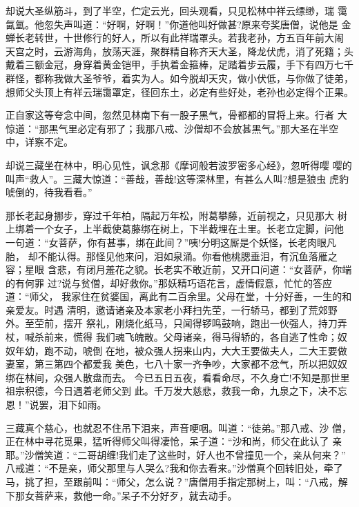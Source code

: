 却说大圣纵筋斗，到了半空，伫定云光，回头观看，只见松林中祥云缥缈，瑞
霭氤氲。他忽失声叫道：“好啊，好啊！”你道他叫好做甚?原来夸奖唐僧，说他是
金蝉长老转世，十世修行的好人，所以有此祥瑞罩头。若我老孙，方五百年前大闹
天宫之时，云游海角，放荡天涯，聚群精自称齐天大圣，降龙伏虎，消了死籍；头
戴着三额金冠，身穿着黄金铠甲，手执着金箍棒，足踏着步云履，手下有四万七千
群怪，都称我做大圣爷爷，着实为人。如今脱却天灾，做小伏低，与你做了徒弟，
想师父头顶上有祥云瑞霭罩定，径回东土，必定有些好处，老孙也必定得个正果。

正自家这等夸念中间，忽然见林南下有一股子黑气，骨都都的冒将上来。行者
大惊道：“那黑气里必定有邪了；我那八戒、沙僧却不会放甚黑气。”那大圣在半空
中，详察不定。

却说三藏坐在林中，明心见性，讽念那《摩诃般若波罗密多心经》，忽听得嘤
嘤的叫声“救人”。三藏大惊道：“善哉，善哉!这等深林里，有甚么人叫?想是狼虫
虎豹唬倒的，待我看看。”

那长老起身挪步，穿过千年柏，隔起万年松，附葛攀藤，近前视之，只见那大
树上绑着一个女子，上半截使葛藤绑在树上，下半截埋在土里。长老立定脚，问他
一句道：“女菩萨，你有甚事，绑在此间？”咦!分明这厮是个妖怪，长老肉眼凡胎，
却不能认得。那怪见他来问，泪如泉涌。你看他桃腮垂泪，有沉鱼落雁之容；星眼
含悲，有闭月羞花之貌。长老实不敢近前，又开口问道：“女菩萨，你端的有何罪
过?说与贫僧，却好救你。”那妖精巧语花言，虚情假意，忙忙的答应道：“师父，
我家住在贫婆国，离此有二百余里。父母在堂，十分好善，一生的和亲爱友。时遇
清明，邀请诸亲及本家老小拜扫先茔，一行轿马，都到了荒郊野外。至茔前，摆开
祭礼，刚烧化纸马，只闻得锣鸣鼓响，跑出一伙强人，持刀弄杖，喊杀前来，慌得
我们魂飞魄散。父母诸亲，得马得轿的，各自逃了性命；奴奴年幼，跑不动，唬倒
在地，被众强人拐来山内，大大王要做夫人，二大王要做妻室，第三第四个都爱我
美色，七八十家一齐争吵，大家都不忿气，所以把奴奴绑在林间，众强人散盘而去。
今已五日五夜，看看命尽，不久身亡!不知是那世里祖宗积德，今日遇着老师父到
此。千万发大慈悲，救我一命，九泉之下，决不忘恩！”说罢，泪下如雨。

三藏真个慈心，也就忍不住吊下泪来，声音哽咽。叫道：“徒弟。”那八戒、沙
僧，正在林中寻花觅果，猛听得师父叫得凄怆，呆子道：“沙和尚，师父在此认了
亲耶。”沙僧笑道：“二哥胡缠!我们走了这些时，好人也不曾撞见一个，亲从何来？”
八戒道：“不是亲，师父那里与人哭么?我和你去看来。”沙僧真个回转旧处，牵了
马，挑了担，至跟前叫：“师父，怎么说？”唐僧用手指定那树上，叫：“八戒，解
下那女菩萨来，救他一命。”呆子不分好歹，就去动手。


